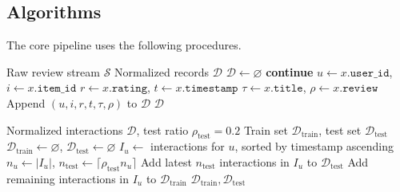 \documentclass[sigconf,nonacm]{acmart}
\begin{document}
\subsection{Algorithms}
The core pipeline uses the following procedures.

\begin{algorithm}[t]
\caption{Record Normalization}
\label{alg:record-normalization}
\begin{algorithmic}[1]
\Require Raw review stream $\mathcal{S}$
\Ensure Normalized records $\mathcal{D}$
\State $\mathcal{D} \gets \varnothing$
    \State \textbf{continue}
  \EndIf
  \State $u \gets x.\texttt{user\_id}$, $i \gets x.\texttt{item\_id}$
  \State $r \gets x.\texttt{rating}$, $t \gets x.\texttt{timestamp}$
  \State $\tau \gets x.\texttt{title}$, $\rho \gets x.\texttt{review}$
  \State Append $(u, i, r, t, \tau, \rho)$ to $\mathcal{D}$
\EndFor
\State \Return $\mathcal{D}$
\end{algorithmic}
\end{algorithm}

\begin{algorithm}[t]
\caption{Per-User Temporal Train/Test Split}
\label{alg:temporal-split}
\begin{algorithmic}[1]
\Require Normalized interactions $\mathcal{D}$, test ratio $\rho_{\mathrm{test}} = 0.2$
\Ensure Train set $\mathcal{D}_{\mathrm{train}}$, test set $\mathcal{D}_{\mathrm{test}}$
\State $\mathcal{D}_{\mathrm{train}} \gets \varnothing$, $\mathcal{D}_{\mathrm{test}} \gets \varnothing$
  \State $I_u \gets$ interactions for $u$, sorted by timestamp ascending
  \State $n_u \gets |I_u|$, $n_{\mathrm{test}} \gets \lceil \rho_{\mathrm{test}} n_u \rceil$
  \State Add latest $n_{\mathrm{test}}$ interactions in $I_u$ to $\mathcal{D}_{\mathrm{test}}$
  \State Add remaining interactions in $I_u$ to $\mathcal{D}_{\mathrm{train}}$
\EndFor
\State \Return $\mathcal{D}_{\mathrm{train}}, \mathcal{D}_{\mathrm{test}}$
\end{algorithmic}
\end{algorithm}
\end{document}

